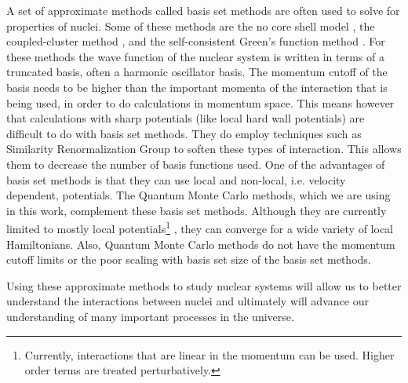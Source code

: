 A set of approximate methods called basis set methods are often used to solve for properties of nuclei. Some of these methods are the no core shell model \cite{navratil2009,barrett2013}, the coupled-cluster method \cite{hagen2014}, and the self-consistent Green's function method \cite{dickhoff2004,soma2014}. For these methods the wave function of the nuclear system is written in terms of a truncated basis, often a harmonic oscillator basis. The momentum cutoff of the basis needs to be higher than the important momenta of the interaction that is being used, in order to do calculations in momentum space. This means however that calculations with sharp potentials (like local hard wall potentials) are difficult to do with basis set methods. They do employ techniques such as Similarity Renormalization Group \cite{hergert2016} to soften these types of interaction. This allows them to decrease the number of basis functions used. One of the advantages of basis set methods is that they can use local and non-local, i.e. velocity dependent, potentials. The Quantum Monte Carlo \cite{carlson2015} methods, which we are using in this work, complement these basis set methods. Although they are currently limited to mostly local potentials\footnote{Currently, interactions that are linear in the momentum can be used. Higher order terms are treated perturbatively.} \cite{lynn2012}, they can converge for a wide variety of local Hamiltonians. Also, Quantum Monte Carlo methods do not have the momentum cutoff limits or the poor scaling with basis set size of the basis set methods.

Using these approximate methods to study nuclear systems will allow us to better understand the interactions between nuclei and ultimately will advance our understanding of many important processes in the universe.
